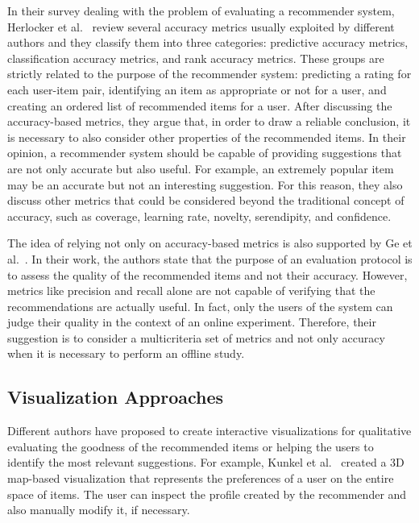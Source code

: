 In their survey dealing with the problem of evaluating a recommender system, Herlocker et al.~\cite{Herlocker2004} review several accuracy metrics usually exploited by different authors and they classify them into three categories: predictive accuracy metrics, classification accuracy metrics, and rank accuracy metrics. These groups are strictly related to the purpose of the recommender system: predicting a rating for each user-item pair, identifying an item as appropriate or not for a user, and creating an ordered list of recommended items for a user. After discussing the accuracy-based metrics, they argue that, in order to draw a reliable conclusion, it is necessary to also consider other properties of the recommended items. In their opinion, a recommender system should be capable of providing suggestions that are not only accurate but also useful. For example, an extremely popular item may be an accurate but not an interesting suggestion. For this reason, they also discuss other metrics that could be considered beyond the traditional concept of accuracy, such as coverage, learning rate, novelty, serendipity, and confidence.

The idea of relying not only on accuracy-based metrics is also supported by Ge et al.~\cite{Ge2010}. In their work, the authors state that the purpose of an evaluation protocol is to assess the quality of the recommended items and not their accuracy. However, metrics like precision and recall alone are not capable of verifying that the recommendations are actually useful. In fact, only the users of the system can judge their quality in the context of an online experiment. Therefore, their suggestion is to consider a multicriteria set of metrics and not only accuracy when it is necessary to perform an offline study.

\subsection{Visualization Approaches}

Different authors have proposed to create interactive visualizations for qualitative evaluating the goodness of the recommended items or helping the users to identify the most relevant suggestions. For example, Kunkel et al.~\cite{Kunkel2017} created a 3D map-based visualization that represents the preferences of a user on the entire space of items. The user can inspect the profile created by the recommender and also manually modify it, if necessary.

